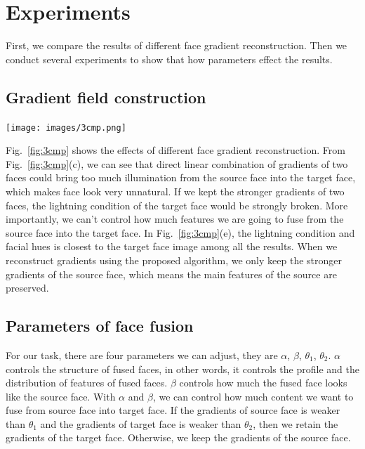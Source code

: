 \section{Experiments}


First, we compare the results of different face gradient reconstruction.
Then we conduct several experiments to show that how parameters effect the results.


\subsection{Gradient field construction}
\begin{center}
    \texttt{[image: images/3cmp.png]}
    \label{fig:3cmp}
\end{center}

Fig.~\ref{fig:3cmp} shows the effects of different face gradient reconstruction. From Fig.~\ref{fig:3cmp}(c), we can see that direct linear combination of  gradients of two faces could bring too much illumination from the source face into the target face, which makes face look very unnatural.
%
If we kept the stronger gradients of two faces, the lightning condition of the target face would be strongly broken.
%
More importantly, we can't control how much features we are going to fuse from the source face into the target face.
In Fig.~\ref{fig:3cmp}(e), the lightning condition and facial hues is closest to the target face image among all the results.
%
When we reconstruct gradients using the proposed algorithm, we only keep the stronger gradients of the source face, which means the main features of the source are preserved.

\subsection{Parameters of face fusion}

 For our task, there are four parameters we can adjust, they are $\alpha$, $\beta$, $\theta_1$, $\theta_2$. $\alpha$ controls the structure of fused faces, in other words, it controls the profile and the distribution of features of fused faces. $\beta$ controls how much the fused face looks like the source face.
 With $\alpha$ and $\beta$, we can control how much content we want to fuse from source face into target face.
 If the gradients of source face is weaker than $\theta_1$ and the gradients of target face is weaker than $\theta_2$, then we retain the gradients of the target face.
 Otherwise, we keep the gradients of the source face.

